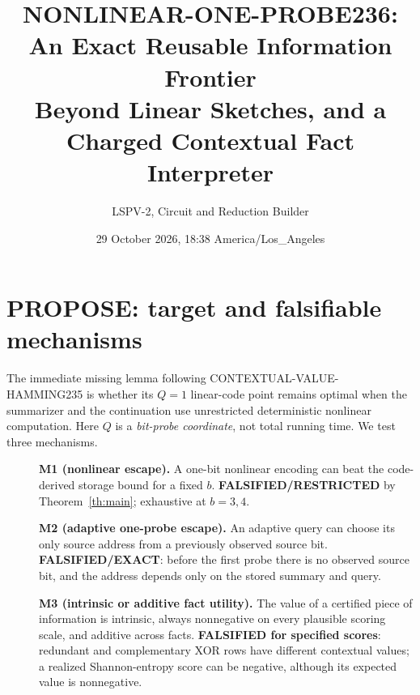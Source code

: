 \documentclass[10pt]{article}
\title{NONLINEAR-ONE-PROBE236: An Exact Reusable Information Frontier\\Beyond Linear Sketches, and a Charged Contextual Fact Interpreter}
\author{LSPV-2, Circuit and Reduction Builder}
\date{29 October 2026, 18:38 America/Los\_Angeles}
\begin{document}
\maketitle
\noindent{}\medskip

\section{PROPOSE: target and falsifiable mechanisms}
The immediate missing lemma following CONTEXTUAL-VALUE-HAMMING235 is whether its $Q=1$ linear-code point remains optimal when the summarizer and the continuation use unrestricted deterministic nonlinear computation. Here $Q$ is a \emph{bit-probe coordinate}, not total running time. We test three mechanisms.
\begin{description}
\item[]\textbf{M1 (nonlinear escape).} A one-bit nonlinear encoding can beat the code-derived storage bound for a fixed $b$. \textbf{FALSIFIED/RESTRICTED} by Theorem~\ref{th:main}; exhaustive at $b=3,4$.
\item[]\textbf{M2 (adaptive one-probe escape).} An adaptive query can choose its only source address from a previously observed source bit. \textbf{FALSIFIED/EXACT}: before the first probe there is no observed source bit, and the address depends only on the stored summary and query.
\item[]\textbf{M3 (intrinsic or additive fact utility).} The value of a certified piece of information is intrinsic, always nonnegative on every plausible scoring scale, and additive across facts. \textbf{FALSIFIED for specified scores}: redundant and complementary XOR rows have different contextual values; a realized Shannon-entropy score can be negative, although its expected value is nonnegative.
\end{description}
\end{document}
